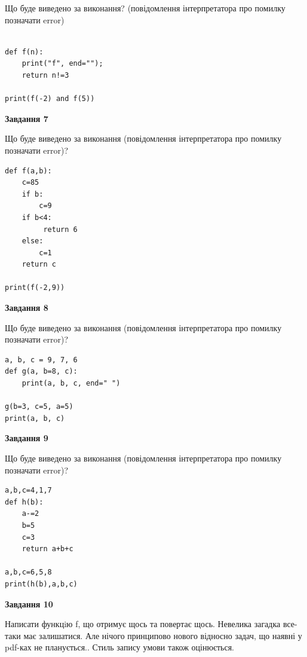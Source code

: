 \documentclass[12pt, ukrainian]{article}
\begin{document}
{\begin {large}
Що буде виведено за виконання? (повідомлення інтерпретатора про помилку позначати error)\par
\begin{verbatim}

def f(n):
    print("f", end="");
    return n!=3

print(f(-2) and f(5))
\end{verbatim}

{\begin {center}\textbf{Завдання 7}\end {center}}

Що буде виведено за виконання (повідомлення інтерпретатора про помилку позначати error)?\par
\begin{verbatim}
def f(a,b):
    c=85
    if b:
        c=9
    if b<4:
         return 6
    else: 
        c=1
    return c

print(f(-2,9))
\end{verbatim}

{\begin {center}\textbf{Завдання 8}\end {center}}

Що буде виведено за виконання (повідомлення інтерпретатора про помилку позначати error)?\par
\begin{verbatim}
a, b, c = 9, 7, 6
def g(a, b=8, c):
    print(a, b, c, end=" ")

g(b=3, c=5, a=5)
print(a, b, c)
\end{verbatim}

{\begin {center}\textbf{Завдання 9}\end {center}}

Що буде виведено за виконання (повідомлення інтерпретатора про помилку позначати error)?\par
\begin{verbatim}
a,b,c=4,1,7
def h(b):
    a-=2
    b=5
    c=3
    return a+b+c

a,b,c=6,5,8
print(h(b),a,b,c)
\end{verbatim}

{\begin {center}\textbf{Завдання 10}\end {center}}


Написати функцiю f, що отримує щось та повертає щось. Невелика загадка все-таки має залишатися. Але нічого принципово нового відносно задач, що наявні у pdf-ках не планується.. Стиль запису умови також оцінюється.\par
\end {large}}
\newpage
\end{document}
